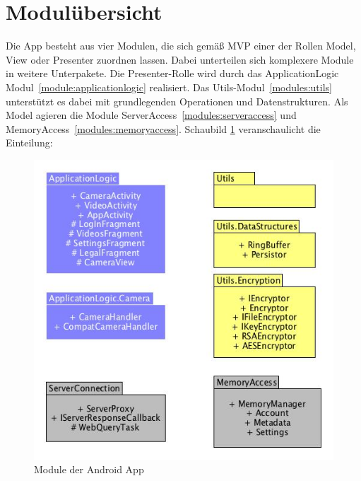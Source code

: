 \section{Modulübersicht}
Die App besteht aus vier Modulen, die sich gemäß MVP einer der Rollen Model, View oder Presenter zuordnen lassen. Dabei unterteilen sich komplexere Module in weitere Unterpakete. Die Presenter-Rolle wird durch das ApplicationLogic Modul~\eqref{module:applicationlogic} realisiert. Das Utils-Modul~\eqref{modules:utils} unterstützt es dabei mit grundlegenden Operationen und Datenstrukturen. Als Model agieren die Module ServerAccess~\eqref{modules:serveraccess} und MemoryAccess~\eqref{modules:memoryaccess}. Schaubild \ref{fig:modules_overview} veranschaulicht die Einteilung:
\begin{figure}[ht]
	\centering
\includegraphics[width=1\textwidth]{./resources/Diagramme/App/modules_overview.jpg}
\caption{Module der Android App}
	\label{fig:modules_overview}
\end{figure}




